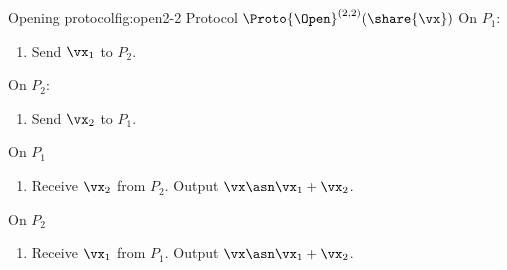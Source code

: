 \begin{Boxfig}{Opening protocol}{fig:open2-2}
  {Protocol $\Proto{\Open}^{(2,2)}(\share{\vx})$}
  On $P_1$:
  \begin{enumerate}
    \item Send $\vx_1$ to $P_2$.
  \end{enumerate}
   On $P_2$:
  \begin{enumerate}
    \item Send $\vx_2$ to $P_1$.
  \end{enumerate}
  On $P_1$
  \begin{enumerate}
    \item Receive $\vx_2$ from $P_2$. Output
    $\vx \asn \vx_1 + \vx_2$.
  \end{enumerate}
  On $P_2$
  \begin{enumerate}
    \item Receive $\vx_1$ from $P_1$. Output $\vx \asn \vx_1 + \vx_2$.
  \end{enumerate}
\end{Boxfig}







